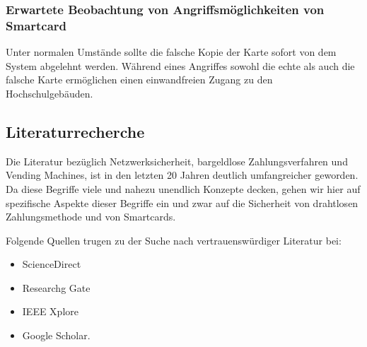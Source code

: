 \subsubsection{Erwartete Beobachtung von Angriffsmöglichkeiten von Smartcard}
Unter normalen Umstände sollte die falsche Kopie der Karte sofort von dem System abgelehnt werden. Während eines Angriffes
sowohl die echte als auch die falsche Karte ermöglichen einen einwandfreien Zugang zu den Hochschulgebäuden.


\subsection{Literaturrecherche}

Die Literatur bezüglich Netzwerksicherheit, bargeldlose Zahlungsverfahren und Vending Machines, ist in den letzten 20 
Jahren deutlich umfangreicher geworden. Da diese Begriffe viele und nahezu unendlich Konzepte decken, gehen wir hier
auf spezifische Aspekte dieser Begriffe ein und zwar auf die Sicherheit von drahtlosen Zahlungsmethode und von 
Smartcards. 

Folgende Quellen trugen zu der Suche nach vertrauenswürdiger Literatur bei:

\begin{itemize}
    \item ScienceDirect
    \item Researchg Gate
    \item IEEE Xplore
    \item Google Scholar.
\end{itemize}
